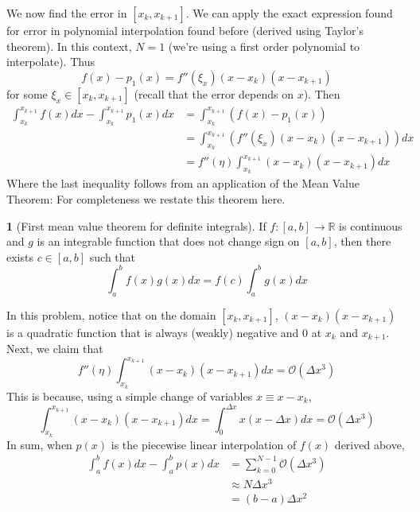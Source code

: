 \documentclass[12pt]{article}
\theoremstyle{definition}
\newcommand{\R}{\mathbb{R}}
\newtheorem{theorem}{\color{ForestGreen}{\textbf{Theorem}}}
\theoremstyle{definition}
\begin{document}
We now find the error in $[x_k, x_{k+1}]$. We can apply the exact expression found for error in polynomial interpolation found before (derived using Taylor's theorem). In this context, $N=1$ (we're using a first order polynomial to interpolate). Thus 
\begin{equation}
	f(x) - p_1(x) = f''(\xi_x)(x - x_k)(x - x_{k+1})
\end{equation}
for some $\xi_x \in [x_k, x_{k+1}]$ (recall that the error depends on $x$). Then
\begin{align*}
	\int_{x_k}^{x_{k+1}} f(x) dx - \int_{x_k}^{x_{k+1}} p_1(x)dx &= \int_{x_k}^{x_{k+1}} ( f(x) - p_1(x)) \\
	&= \int_{x_k}^{x_{k+1}} (f''(\xi_x)(x - x_k)(x - x_{k+1}))dx \\
	&= f''(\eta) \int_{x_k}^{x_{k+1}} (x - x_k)(x - x_{k+1}) dx
\end{align*}
Where the last inequality follows from an application of the Mean Value Theorem: For completeness we restate this theorem here.
\begin{theorem}[First mean value theorem for definite integrals]
	If $f:[a,b] \to \R$ is continuous and $g$ is an integrable function that does not change sign on $[a,b]$, then there exists $c \in [a,b]$ such that
	\begin{equation}
		\int_a^b f(x)g(x) dx = f(c)\int_a^b g(x)dx
	\end{equation}
\end{theorem}
In this problem, notice that on the domain $[x_k, x_{k+1}]$, $(x - x_k)(x - x_{k+1})$ is a quadratic function that is always (weakly) negative and $0$ at $x_k$ and $x_{k+1}$. Next, we claim that
\begin{equation}
	f''(\eta) \int_{x_k}^{x_{k+1}} (x - x_k)(x - x_{k+1}) dx = \mathcal{O}(\Delta x^3)
\end{equation}
This is because, using a simple change of variables $x \equiv x - x_k$,
\begin{equation}
	\int_{x_k}^{x_{k+1}} (x - x_k)(x - x_{k+1}) dx = \int_{0}^{\Delta x} x(x - \Delta x) dx = \mathcal{O}(\Delta x^3)
\end{equation}
In sum, when $p(x)$ is the piecewise linear interpolation of $f(x)$ derived above,
\begin{align*}
	\int_a^b f(x)dx - \int_a^b p(x) dx &= \sum_{k=0}^{N-1} \mathcal{O}(\Delta x^3) \\
	&\approx N \Delta x^3 \\
	&= (b-a) \Delta x^2 \tag{Recall $N\Delta x = b-a$}
\end{align*}
\end{document}

